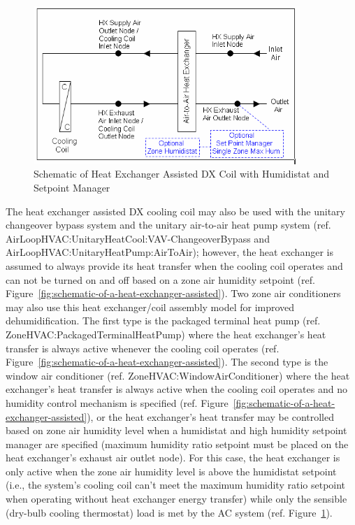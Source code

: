 \begin{figure}[hbtp] %
\centering
\includegraphics[width=0.9\textwidth, height=0.9\textheight, keepaspectratio=true]{media/image4095.png}
\caption{Schematic of Heat Exchanger Assisted DX Coil with Humidistat and Setpoint Manager \protect \label{fig:schematic-of-heat-exchanger-assisted-dx-coil}}
\end{figure}

The heat exchanger assisted DX cooling coil may also be used with the unitary changeover bypass system and the unitary air-to-air heat pump system (ref. AirLoopHVAC:UnitaryHeatCool:VAV-ChangeoverBypass and AirLoopHVAC:UnitaryHeatPump:AirToAir); however, the heat exchanger is assumed to always provide its heat transfer when the cooling coil operates and can not be turned on and off based on a zone air humidity setpoint (ref. Figure~\ref{fig:schematic-of-a-heat-exchanger-assisted}). Two zone air conditioners may also use this heat exchanger/coil assembly model for improved dehumidification. The first type is the packaged terminal heat pump (ref. ZoneHVAC:PackagedTerminalHeatPump) where the heat exchanger's heat transfer is always active whenever the cooling coil operates (ref. Figure~\ref{fig:schematic-of-a-heat-exchanger-assisted}). The second type is the window air conditioner (ref. ZoneHVAC:WindowAirConditioner) where the heat exchanger's heat transfer is always active when the cooling coil operates and no humidity control mechanism is specified (ref. Figure~\ref{fig:schematic-of-a-heat-exchanger-assisted}), or the heat exchanger's heat transfer may be controlled based on zone air humidity level when a humidistat and high humidity setpoint manager are specified (maximum humidity ratio setpoint must be placed on the heat exchanger's exhaust air outlet node). For this case, the heat exchanger is only active when the zone air humidity level is above the humidistat setpoint (i.e., the system's cooling coil can't meet the maximum humidity ratio setpoint when operating without heat exchanger energy transfer) while only the sensible (dry-bulb cooling thermostat) load is met by the AC system (ref. Figure~\ref{fig:schematic-of-heat-exchanger-assisted-dx-coil}).

